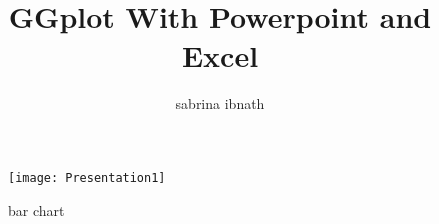 \documentclass{article}
\title{GGplot With Powerpoint and Excel}
\author{sabrina ibnath}
\begin{document}
\begin{figure}
 \centering
 \texttt{[image: Presentation1]}
 \caption{bar chart}
 \label{fig:ggplot}
\end{figure}
\end{document}
